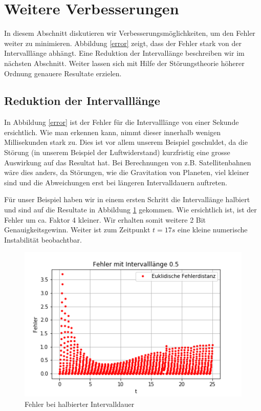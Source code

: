 \section{Weitere Verbesserungen
\label{perturbation:section:weitereverbesserungen}}
In diesem Abschnitt diskutieren wir Verbesserungsmöglichkeiten, um den Fehler weiter zu minimieren. 
Abbildung \ref{error} zeigt, dass der Fehler stark von der Intervalllänge abhängt. 
Eine Reduktion der Intervallänge beschreiben wir im nächsten Abschnitt. Weiter lassen sich mit Hilfe der Störungstheorie höherer Ordnung genauere Resultate erzielen.

\subsection{Reduktion der Intervalllänge}
In Abbildung \ref{error} ist der Fehler für die Intervalllänge von einer Sekunde ersichtlich. 
Wie man erkennen kann, nimmt dieser innerhalb wenigen Millisekunden stark zu. 
Dies ist vor allem unserem Beispiel geschuldet, da die Störung (in unserem Beispiel der Luftwiderstand) kurzfristig eine grosse Auswirkung auf das Resultat hat. 
Bei Berechnungen von z.B. Satellitenbahnen wäre dies anders, da Störungen, wie die Gravitation von Planeten, viel kleiner sind und die Abweichungen erst bei längeren Intervalldauern auftreten.

Für unser Beispiel haben wir in einem ersten Schritt die Intervallänge halbiert und sind auf die Resultate in Abbildung \ref{errorShortInterval} gekommen. 
Wie ersichtlich ist, ist der Fehler um ca. Faktor 4 kleiner. 
Wir erhalten somit weitere 2 Bit Genauigkeitsgewinn. 
Weiter ist zum Zeitpunkt $t=17s$ eine kleine numerische Instabilität beobachtbar.

\begin{figure}
    \centering
    \includegraphics[scale=0.7]{papers/perturbation/bilder/halberintervall.png}
    \caption{Fehler bei halbierter Intervalldauer}
	\label{errorShortInterval}
\end{figure}

